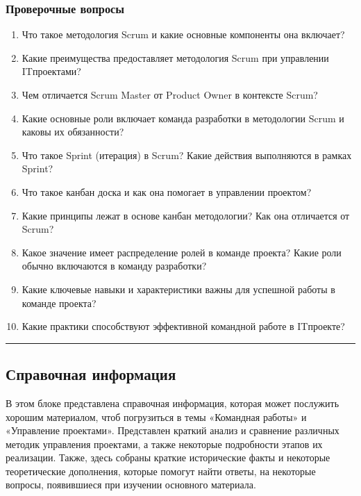 \documentclass[letterpaper,10pt,russian]{sphinxmanual}
\begin{document}
\subsubsection{Проверочные вопросы}
\label{\detokenize{educational_materials/team_work_on_a_project/content:id4}}\begin{enumerate}
%
\item {} 
\sphinxAtStartPar
Что такое методология Scrum и какие основные компоненты она включает?

\item {} 
\sphinxAtStartPar
Какие преимущества предоставляет методология Scrum при управлении IT\sphinxhyphen{}проектами?

\item {} 
\sphinxAtStartPar
Чем отличается Scrum Master от Product Owner в контексте Scrum?

\item {} 
\sphinxAtStartPar
Какие основные роли включает команда разработки в методологии Scrum и каковы их обязанности?

\item {} 
\sphinxAtStartPar
Что такое Sprint (итерация) в Scrum? Какие действия выполняются в рамках Sprint?

\item {} 
\sphinxAtStartPar
Что такое канбан доска и как она помогает в управлении проектом?

\item {} 
\sphinxAtStartPar
Какие принципы лежат в основе канбан методологии? Как она отличается от Scrum?

\item {} 
\sphinxAtStartPar
Какое значение имеет распределение ролей в команде проекта? Какие роли обычно включаются в команду разработки?

\item {} 
\sphinxAtStartPar
Какие ключевые навыки и характеристики важны для успешной работы в команде проекта?

\item {} 
\sphinxAtStartPar
Какие практики способствуют эффективной командной работе в IT\sphinxhyphen{}проекте?

\end{enumerate}


\bigskip\hrule\bigskip



\subsection{Справочная информация}
\label{\detokenize{educational_materials/team_work_on_a_project/content:id5}}
\sphinxAtStartPar
В этом блоке представлена справочная информация, которая может послужить хорошим материалом, чтоб погрузиться в темы «Командная работы» и «Управление проектами». Представлен краткий анализ и сравнение различных методик управления проектами, а также некоторые подробности этапов их реализации. Также, здесь собраны краткие исторические факты и некоторые теоретические дополнения, которые помогут найти ответы, на некоторые вопросы, появившиеся при изучении основного материала.
\end{document}
